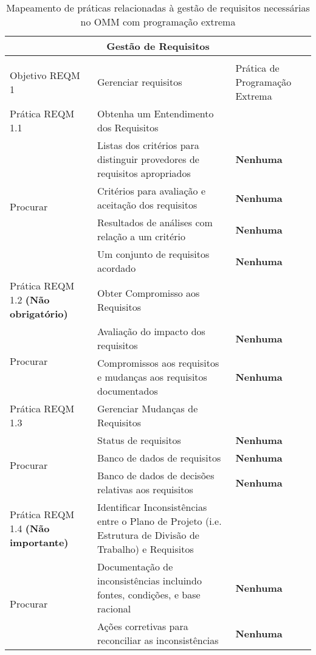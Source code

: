 \begin{longtable}{|p{2cm}|p{7cm}|p{7cm}|}
  \caption{Mapeamento de práticas relacionadas à gestão de requisitos
    necessárias no OMM com programação extrema} \\
  \multicolumn{3}{|c|}{\cellcolor[gray]{0.6} Gestão de Requisitos}\\
  \endhead
  & & \\
  \hline \cellcolor[gray]{0.6} Objetivo REQM 1 & \cellcolor[gray]{0.6}
  Gerenciar requisitos &
  Prática de Programação Extrema \\
  \hline \cellcolor[gray]{0.9} Prática REQM 1.1 & \cellcolor[gray]{0.9}
  Obtenha um Entendimento dos Requisitos &
  \\
  \hline \multirow{4}{*}{Procurar} & Listas dos critérios para
  distinguir provedores de requisitos apropriados  &\textbf{Nenhuma} \\
  \cline{2-3} & Critérios para avaliação e aceitação dos requisitos &\textbf{Nenhuma} \\
  \cline{2-3} & Resultados de análises com relação a um critério
  &\textbf{Nenhuma} \\
  \cline{2-3} & Um conjunto de requisitos acordado &\textbf{Nenhuma} \\
  \hline \cellcolor[gray]{0.9} Prática REQM 1.2 \textbf{(Não
    obrigatório)} & \cellcolor[gray]{0.9} Obter Compromisso aos Requisitos & \\
  \hline \multirow{2}{*}{Procurar} & Avaliação do impacto dos requisitos &\textbf{Nenhuma} \\
  \cline{2-3} & Compromissos aos requisitos e mudanças aos requisitos
  documentados  &\textbf{Nenhuma} \\
  \hline \cellcolor[gray]{0.9} Prática REQM 1.3 & \cellcolor[gray]{0.9}
  Gerenciar Mudanças de Requisitos & \\
  \hline \multirow{3}{*}{Procurar} & Status de requisitos
  &\textbf{Nenhuma} \\
  \cline{2-3} & Banco de dados de requisitos  &\textbf{Nenhuma} \\
  \cline{2-3} & Banco de dados de decisões relativas aos requisitos
  &\textbf{Nenhuma} \\
  \hline \cellcolor[gray]{0.9} Prática REQM 1.4 \textbf{(Não
    importante)} & \cellcolor[gray]{0.9}
  Identificar Inconsistências entre o Plano de Projeto (i.e. Estrutura
  de Divisão de Trabalho) e Requisitos & \\
  \hline \multirow{3}{*}{Procurar} & Documentação de inconsistências
  incluindo fontes, condições, e base racional&\textbf{Nenhuma} \\
  \cline{2-3} & Ações corretivas para reconciliar as inconsistências
  &\textbf{Nenhuma} \\
  \hline
\end{longtable}

